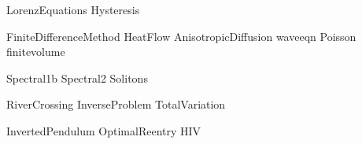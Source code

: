 \documentclass[nociteref]{SIAM-GH-book}
\begin{document}
{LorenzEquations}
{Hysteresis}

{FiniteDifferenceMethod}
{HeatFlow}
{AnisotropicDiffusion}
{waveeqn}
{Poisson}
{finitevolume}


{Spectral1b}
{Spectral2}
{Solitons}

{RiverCrossing}
{InverseProblem}
{TotalVariation}

{InvertedPendulum}
{OptimalReentry}
{HIV}
\end{document}
